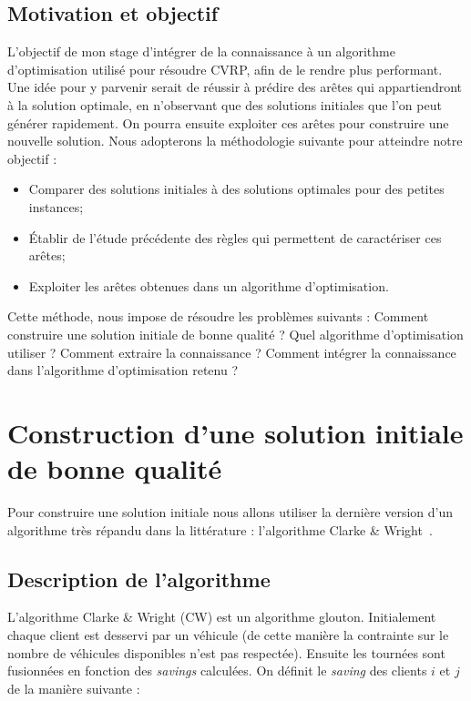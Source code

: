 \documentclass[a4paper,11pt]{article}%
\begin{document}
\subsection{Motivation et objectif}

L'objectif de mon stage d'intégrer de la connaissance à un algorithme d'optimisation utilisé pour résoudre CVRP, afin de le rendre plus performant.
Une idée pour y parvenir serait de réussir à prédire des arêtes qui appartiendront à la solution optimale, en n'observant que des solutions initiales que l'on peut générer rapidement. 
On pourra ensuite exploiter ces arêtes pour construire une nouvelle solution.
Nous adopterons la méthodologie suivante pour atteindre notre objectif :
\begin{itemize}
\item Comparer des solutions initiales à des solutions optimales pour des petites instances;
\item Établir de l'étude précédente des règles qui permettent de caractériser ces arêtes;
\item Exploiter les arêtes obtenues dans un algorithme d'optimisation.
\end{itemize}

Cette méthode, nous impose de résoudre les problèmes suivants : Comment construire une solution initiale de bonne qualité ? Quel algorithme d'optimisation utiliser ? Comment extraire la connaissance ? Comment intégrer la connaissance dans l'algorithme d'optimisation retenu ?

\section{Construction d'une solution initiale de bonne qualité}
Pour construire une solution initiale nous allons utiliser la dernière version d'un algorithme très répandu dans la littérature : l'algorithme Clarke \& Wright~\cite{Altinel_2005}.

\subsection{Description de l'algorithme}
L'algorithme Clarke \& Wright (CW) est un algorithme glouton. 
Initialement chaque client est desservi par un véhicule (de cette manière la contrainte sur le nombre de véhicules disponibles n'est pas respectée). Ensuite les tournées sont fusionnées en fonction des \emph{savings} calculées.
On définit le \emph{saving} des clients $i$ et $j$ de la manière suivante :
\end{document}
